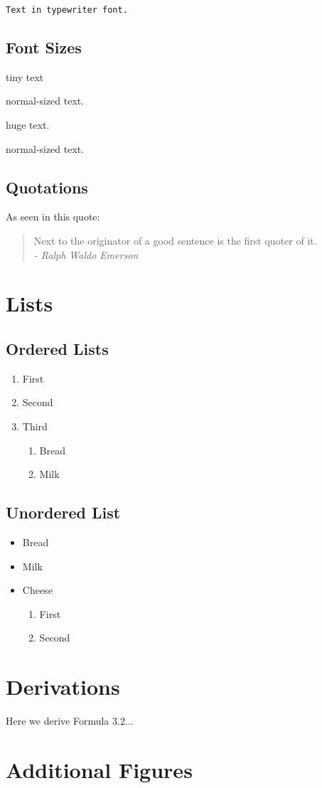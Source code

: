 \documentclass[a4paper, twocolumn]{article}
\begin{document}
{\tt Text in typewriter font.}

\subsection{Font Sizes}
{\tiny tiny text} \\
\begin{normalsize}
normal-sized text. \\
\end{normalsize}
\begin{huge}
huge text.
\end{huge}

normal-sized text. 

\subsection{Quotations}
As seen in this quote:

\begin{quote}
	Next to the originator of a good sentence
	is the first quoter of it. \\
	\textit{- Ralph Waldo Emerson}
\end{quote}

\section{Lists}
\subsection{Ordered Lists}
\begin{enumerate}
	\item First
	\item Second
	\item Third
	\begin{enumerate}
		\item Bread
		\item Milk
	\end{enumerate}
\end{enumerate}

\subsection{Unordered List}
\begin{itemize}
	\item Bread
	\item Milk
	\item Cheese
	\begin{enumerate}
		\item First
		\item Second
	\end{enumerate}
\end{itemize}



\appendix
\section{Derivations}
Here we derive Formula 3.2...

\section{Additional Figures}
\end{document}
